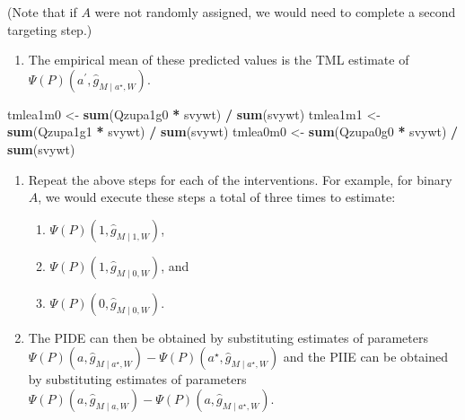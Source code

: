 \documentclass[
  12pt, krantz2,
]{book}
\makeatletter
\newenvironment{Shaded}{\begin{snugshade}}{\end{snugshade}}
\newcommand{\KeywordTok}[1]{\textcolor[rgb]{0.13,0.29,0.53}{\textbf{#1}}}
\newcommand{\NormalTok}[1]{#1}
\newcommand{\OperatorTok}[1]{\textcolor[rgb]{0.81,0.36,0.00}{\textbf{#1}}}
\newcommand{\StringTok}[1]{\textcolor[rgb]{0.31,0.60,0.02}{#1}}
\providecommand{\tightlist}{%
  \setlength{\itemsep}{0pt}\setlength{\parskip}{0pt}}
\newenvironment{kframe}{%
\medskip{}
\setlength{\fboxsep}{.8em}
 \def\at@end@of@kframe{}%
 \ifinner\ifhmode%
  \def\at@end@of@kframe{\end{minipage}}%
  \begin{minipage}{\columnwidth}%
 \fi\fi%
 \def\FrameCommand##1{\hskip\@totalleftmargin \hskip-\fboxsep
 \colorbox{shadecolor}{##1}\hskip-\fboxsep
     \hskip-\linewidth \hskip-\@totalleftmargin \hskip\columnwidth}%
 \MakeFramed {\advance\hsize-\width
   \@totalleftmargin\z@ \linewidth\hsize
   \@setminipage}}%
 {\par\unskip\endMakeFramed%
 \at@end@of@kframe}
\renewenvironment{Shaded}{\begin{kframe}}{\end{kframe}}
\theoremstyle{definition}
\theoremstyle{definition}
\theoremstyle{definition}
\newcommand{\1}{\mathbbm{1}}
\makeatother
\begin{document}
(Note that if \(A\) were not randomly assigned, we would need to complete a
second targeting step.)

\begin{enumerate}
\def\labelenumi{\arabic{enumi}.}
\setcounter{enumi}{9}
\tightlist
\item
  The empirical mean of these predicted values is the TML estimate of
  \(\Psi(P)(a^\prime, \hat{g}_{M \mid a^{\star}, W})\).
\end{enumerate}

\begin{Shaded}
\begin{Highlighting}[]
\NormalTok{tmlea1m0 <-}\StringTok{ }\KeywordTok{sum}\NormalTok{(Qzupa1g0 }\OperatorTok{*}\StringTok{ }\NormalTok{svywt) }\OperatorTok{/}\StringTok{ }\KeywordTok{sum}\NormalTok{(svywt)}
\NormalTok{tmlea1m1 <-}\StringTok{ }\KeywordTok{sum}\NormalTok{(Qzupa1g1 }\OperatorTok{*}\StringTok{ }\NormalTok{svywt) }\OperatorTok{/}\StringTok{ }\KeywordTok{sum}\NormalTok{(svywt)}
\NormalTok{tmlea0m0 <-}\StringTok{ }\KeywordTok{sum}\NormalTok{(Qzupa0g0 }\OperatorTok{*}\StringTok{ }\NormalTok{svywt) }\OperatorTok{/}\StringTok{ }\KeywordTok{sum}\NormalTok{(svywt)}
\end{Highlighting}
\end{Shaded}

\begin{enumerate}
\def\labelenumi{\arabic{enumi}.}
\setcounter{enumi}{10}
\tightlist
\item
  Repeat the above steps for each of the interventions. For example, for
  binary \(A\), we would execute these steps a total of three times to
  estimate:

  \begin{enumerate}
  \def\labelenumii{\arabic{enumii}.}
  \tightlist
  \item
    \(\Psi(P)(1,\hat{g}_{M \mid 1, W})\),
  \item
    \(\Psi(P)(1,\hat{g}_{M \mid 0, W})\), and
  \item
    \(\Psi(P)(0,\hat{g}_{M \mid 0, W})\).
  \end{enumerate}
\item
  The PIDE can then be obtained by substituting estimates of parameters
  \(\Psi(P)(a,\hat{g}_{M \mid a^{\star}, W}) - \Psi(P)(a^{\star},\hat{g}_{M \mid a^{\star}, W})\) and the PIIE
  can be obtained by substituting estimates of parameters
  \(\Psi(P)(a,\hat{g}_{M \mid a,W}) - \Psi(P)(a, \hat{g}_{M \mid a^{\star}, W})\).
\end{enumerate}
\end{document}
